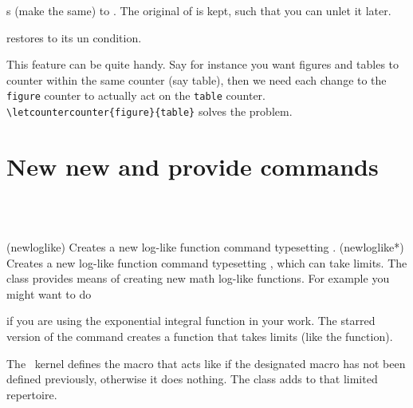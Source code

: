  s 
(make the same)  to . The
original of  is kept, such that you can unlet it later.

 restores  to its un
condition.

This feature can be quite handy. Say for instance you want figures and
tables to counter within the same counter (say table), then we need
each change to the \verb?figure? counter to actually act on the
\verb?table? counter. \verb?\letcountercounter{figure}{table}? solves
the problem.



\section{New new and provide commands}

\begin{syntax}
\cmd{\newloglike} \\
\cmd{\newloglike*} \\
\end{syntax}
\glossary(newloglike)%
  {}%
  {Creates a new log-like function command  typesetting 
   .}
\glossary(newloglike*)%
  {}%
  {Creates a new log-like function command  typesetting 
   , which can take limits.}
The class provides means of creating new math log-like functions. For
example you might want to do
\begin{lcode}
\end{lcode}
if you are using the exponential integral function in your work.
The starred version of the command creates a function that takes limits
(like the \cmd{\max} function).

    The \ltx\ kernel defines the \cmd{\providecommand} macro that acts
like \cmd{\newcommand} if the designated macro has not been defined
previously, otherwise it does nothing. The class adds to that limited
repertoire.

